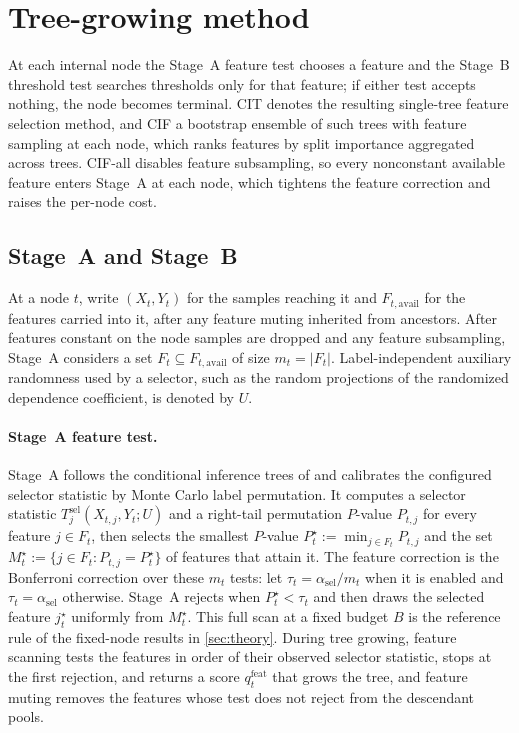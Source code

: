 \section{Tree-growing method}
\label{sec:method}

At each internal node the Stage~A feature test chooses a feature and the
Stage~B threshold test searches thresholds only for that feature; if either
test accepts nothing, the node becomes terminal. CIT denotes the resulting single-tree feature selection method, and
CIF a bootstrap ensemble of such trees with feature sampling at each node,
which ranks features by split importance aggregated across trees. CIF-all
disables feature subsampling, so every nonconstant available feature enters
Stage~A at each node, which tightens the feature correction and raises the
per-node cost.

\subsection{Stage~A and Stage~B}
\label{sec:stageA-stageB}

At a node $t$, write $(X_t,Y_t)$ for the samples reaching it and
$F_{t,\mathrm{avail}}$ for the features carried into it, after any feature
muting inherited from ancestors. After features constant on the node samples
are dropped and any feature subsampling, Stage~A considers a set
$F_t \subseteq F_{t,\mathrm{avail}}$ of size $m_t=|F_t|$. Label-independent
auxiliary randomness used by a selector, such as the random projections of the
randomized dependence coefficient, is denoted by $U$.

\paragraph{Stage~A feature test.}
Stage~A follows the conditional inference trees of
\citet{Hothorn2006UnbiasedRecursivePartitioning} and calibrates the configured
selector statistic by Monte Carlo label permutation. It computes a selector
statistic $T^{\mathrm{sel}}_j(X_{t,j},Y_t;U)$ and a right-tail permutation
$P$-value $P_{t,j}$ for every feature $j \in F_t$, then selects the smallest
$P$-value $P_t^{\star} := \min_{j \in F_t} P_{t,j}$ and the set
$M_t^\star := \{j \in F_t : P_{t,j}=P_t^{\star}\}$ of features that attain it.
The feature correction is the Bonferroni correction over these $m_t$ tests:
let $\tau_t=\alpha_{\mathrm{sel}}/m_t$ when it is enabled and
$\tau_t=\alpha_{\mathrm{sel}}$ otherwise. Stage~A rejects when
$P_t^{\star} < \tau_t$ and then draws the selected feature $j_t^{\star}$
uniformly from $M_t^\star$. This full scan at a fixed budget $B$ is the
reference rule of the fixed-node results in \cref{sec:theory}. During tree growing, feature scanning tests the features in
order of their observed selector statistic, stops at the first rejection, and
returns a score $q_t^{\mathrm{feat}}$ that grows the tree, and feature muting
removes the features whose test does not reject from the descendant pools.

